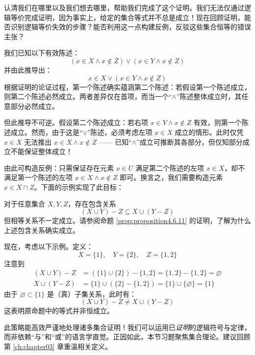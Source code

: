 认清我们在哪里以及我们想去哪里，帮助我们完成了这个证明。我们无法仅通过逻辑等价完成证明，因为事实上，给定的集合等式并不总是成立！现在回顾证明，能否识别逻辑等价失效的步骤？能否利用这一点构建反例，反驳这些集合恒等的错误主张？

我们已知以下有效陈述：
\[(x \in X \land x \notin Z) \lor (x \in Y \land x \notin Z)\]
并由此推导出：
\[x \in X \lor (x \in Y \land x \notin Z)\]
根据证明的论证过程，第一个陈述确实蕴涵第二个陈述：若假设第一个陈述成立，则第二个陈述必然成立。两者差异仅在首项，而当一个``$\land$''陈述整体成立时，其任意部分必然成立。

但此推导不可逆。假设第二个陈述成立：若右项 $x \in Y \land x \notin Z$ 有效，则第一个陈述成立。然而，由于这是``$\lor$''陈述，必须考虑左项 $x \in X$ 成立的情形。此时仅凭 $x \in X$ 无法推出 $x \in X \land x \notin Z$ —— 已知``$\land$''成立可推断其各部分，但仅知部分成立不能保证整体成立！

由此可构造反例：只需保证存在元素 $x \in U$ 满足第二个陈述的左项 $x \in X$，却不满足第一个陈述的左项 $x \in X \land x \notin Z$ 即可。换言之，我们需要构造元素 $x \in X \cap Z$。下面的示例实现了此目标：

\begin{example}
    对于任意集合 $X,Y,Z$，存在包含关系
    \[(X \cup Y ) - Z \subseteq X \cup (Y - Z)\]
    但相等关系不一定成立。请参阅命题 \ref{prop:proposition4.6.11} 的证明，了解为什么上述包含关系确实成立。
\end{example}

现在，考虑以下示例。定义：
\[X = \{1\}, \quad Y = \{2\}, \quad Z = \{1, 2\}\]
注意到
\begin{align*}
    (X \cup Y) - Z &= (\{1\} \cup \{2\}) - \{1, 2\} = \{1, 2\} - \{1, 2\} = \varnothing \\
    X \cup (Y - Z) &= \{1\} \cup (\{2\} - \{1, 2\}) = \{1\} \cup \{\varnothing\} = \{1\}
\end{align*}
由于 $\varnothing \subset \{1\}$ 是（真）子集关系，此时有：
\[(X \cup Y ) - Z \ne X \cup (Y - Z)\]
这表明原命题中的等式并非恒成立。

此策略能高效严谨地处理诸多集合证明！我们可以运用已\emph{证明}的逻辑符号与定律，而非依赖``与''和``或''的语言学直觉。正因如此，本节习题聚焦集合理论。建议回顾第 \ref{ch:chapter03} 章重温相关定义。

